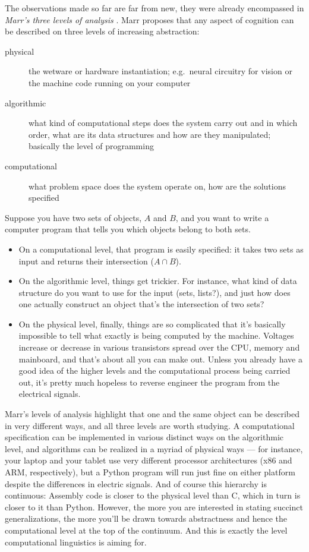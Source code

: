 The observations made so far are far from new, they were already encompassed in \emph{Marr's three levels of analysis} \citep{MarrPoggio76}.
Marr proposes that any aspect of cognition can be described on three levels of increasing abstraction:
%
\begin{description}
    \item[physical] the wetware or hardware instantiation; e.g.\ neural circuitry for vision or the machine code running on your computer
    \item[algorithmic] what kind of computational steps does the system carry out and in which order, what are its data structures and how are they manipulated; basically the level of programming
    \item[computational] what problem space does the system operate on, how are the solutions specified
\end{description}
%
\begin{examplebox}
    Suppose you have two sets of objects, $A$ and $B$, and you want to write a computer program that tells you which objects belong to both sets.
    \begin{itemize}
        \item On a computational level, that program is easily specified: it takes two sets as input and returns their intersection ($A \cap B$).
        \item On the algorithmic level, things get trickier.
        For instance, what kind of data structure do you want to use for the input (sets, lists?), and just how does one actually construct an object that's the intersection of two sets?
    \item On the physical level, finally, things are so complicated that it's basically impossible to tell what exactly is being computed by the machine.
        Voltages increase or decrease in various transistors spread over the CPU, memory and mainboard, and that's about all you can make out.
        Unless you already have a good idea of the higher levels and the computational process being carried out, it's pretty much hopeless to reverse engineer the program from the electrical signals.
    \end{itemize}
\end{examplebox}
%
Marr's levels of analysis highlight that one and the same object can be described in very different ways, and all three levels are worth studying.
A computational specification can be implemented in various distinct ways on the algorithmic level, and algorithms can be realized in a myriad of physical ways --- for instance, your laptop and your tablet use very different processor architectures (x86 and ARM, respectively), but a Python program will run just fine on either platform despite the differences in electric signals.
And of course this hierarchy is continuous: Assembly code is closer to the physical level than C, which in turn is closer to it than Python.
However, the more you are interested in stating succinct generalizations, the more you'll be drawn towards abstractness and hence the computational level at the top of the continuum.
And this is exactly the level computational linguistics is aiming for.

